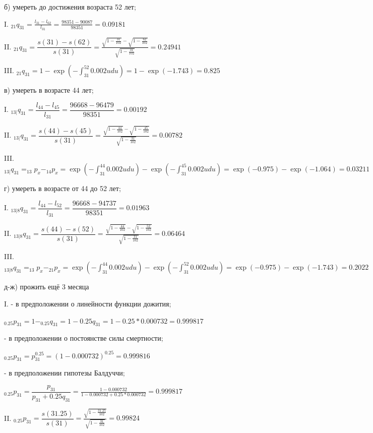 \documentclass[12pt,a4paper, oneside]{extreport}
\begin{document}
б) умереть до достижения возраста 52 лет;

I. $_{21}q_{31} = \frac{l_{31} - l_{62}}{l_{31}} = \frac{98351-90087}{98351} = 0.09181$  

II. $_{21}q_{31} = \dfrac{s(31) - s(62)}{s(31)} = \frac{\sqrt{1-\frac{31}{102}}-\sqrt{1-\frac{62}{102}}}{\sqrt{1-\frac{31}{102}}} = 0.24941$  


III. $_{21}q_{31} = 1 - \exp(-\int_{31}^{52} 0.002u du  )  = 1 -  \exp(-1.743)  = 0.825   $  
 


в) умереть в возрасте 44 лет;

I. $_{13|}q_{31} = \dfrac{l_{44} - l_{45}}{l_{31}} = \dfrac{96668-96479}{98351} = 0.00192$  

II. $_{13|}q_{31} = \dfrac{s(44) - s(45)}{s(31)} = \frac{\sqrt{1-\frac{44}{102}}-\sqrt{1-\frac{45}{102}}}{\sqrt{1-\frac{31}{102}}} = 0.00782$  

III. $_{13|}q_{31} = _{13}p_x -  _{14}p_x  =  \exp(-\int_{31}^{44} 0.002u  du  ) - \exp(-\int_{31}^{45} 0.002u  du  )  = \exp(-0.975)  - \exp(-1.064) = 0.03211 $  


г) умереть в возрасте от 44 до 52 лет;

I. $_{13|8}q_{31} = \dfrac{l_{44} - l_{52}}{l_{31}} = \dfrac{96668-94737}{98351} = 0.01963$  

II. $_{13|8}q_{31} = \dfrac{s(44) - s(52)}{s(31)} = \frac{\sqrt{1-\frac{44}{102}}-\sqrt{1-\frac{52}{102}}}{\sqrt{1-\frac{31}{102}}} = 0.06464$  


III.  $_{13|8}q_{31} = _{13}p_x -  _{21}p_x  =  \exp(-\int_{31}^{44} 0.002u  du  ) - \exp(-\int_{31}^{52} 0.002u  du  )  = \exp(-0.975)  - \exp(-1.743) = 0.2022 $  



д-ж) прожить ещё 3 месяца 

I. - в предположении о линейности функции дожития;

 $_{0.25}p_{31} = 1 - _{0.25}q_{31} = 1 - 0.25 q_{31} = 1 - 0.25 * 0.000732  = 0.999817$  

- в предположении о постоянстве силы смертности;

 $_{0.25}p_{31} =  p_{31}^{0.25}  = (1-0.000732)^{0.25} = 0.999816$  


- в предположении гипотезы Балдуччи;

$_{0.25}p_{31} =  \dfrac{p_{31}}{p_{31} + 0.25 q_{31} }   =  \frac{1-0.000732}{1-0.000732 + 0.25 * 0.000732 } = 0.999817$  


II.  $_{0.25}p_{31} = \dfrac{s(31.25)}{s(31)} = \frac{\sqrt{1-\frac{31.25}{102}}}{\sqrt{1-\frac{31}{102}}} = 0.99824 $  
\end{document}
